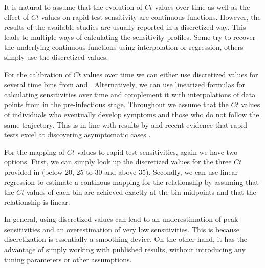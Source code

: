 {    %
    It is natural to assume that the evolution of $Ct$ values over time as well as the
    effect of $Ct$ values on rapid test sensitivity are continuous functions. However,
    the results of the available studies are usually reported in a discretized way. This
    leads to multiple ways of calculating the sensitivity profiles. Some try to recover
    the underlying continuous functions using interpolation or regression, others simply
    use the discretized values.

    For the calibration of $Ct$ values over time we can either use discretized values
    for several time bins from \cite{Ong2021} and \cite{Jang2021}. Alternatively, we can
    use linearized formulas for calculating sensitivities over time \cite{Cosentino2022}
    and complement it with interpolations of data points from \cite{Jang2021} in the
    pre-infectious stage. Throughout we assume that the $Ct$ values of individuals who
    eventually develop symptoms and those who do not follow the same trajectory. This is
    in line with results by \cite{Zuin2021} and recent evidence that rapid tests excel
    at discovering asymptomatic cases \cite{Rosella2022}.

    For the mapping of $Ct$ values to rapid test sensitivities, again we have two
    options. First, we can simply look up the discretized values for the three $Ct$
    provided in \cite{Scheiblauer2021} (below 20, 25 to 30 and above 35). Secondly, we
    can use linear regression to estimate a continous mapping for the relationship by
    assuming that the $Ct$ values of each bin are achieved exactly at the bin midpoints
    and that the relationship is linear.

    In general, using discretized values can lead to an underestimation of peak
    sensitivities and an overestimation of very low sensitivities. This is because
    discretization is essentially a smoothing device. On the other hand, it has the
    advantage of simply working with published results, without introducing any tuning
    parameters or other assumptions.

}
